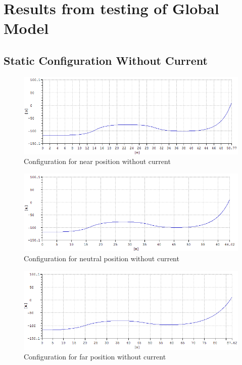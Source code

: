 \chapter{Results from testing of Global Model}
\section{Static Configuration Without Current}

\begin{figure}[H]
\centering
\includegraphics[scale=0.5]{figures/confignear}
\caption{Configuration for near position without current}
 \label{fig:confignear}
\end{figure}

\begin{figure}[H]
\centering
\includegraphics[scale=0.5]{figures/configneu}
\caption{Configuration for neutral position without current}
 \label{fig:configneu}
\end{figure}

\begin{figure}[H]
\centering
\includegraphics[scale=0.5]{figures/configfar}
\caption{Configuration for far position without current}
 \label{fig:configfar}
\end{figure}

